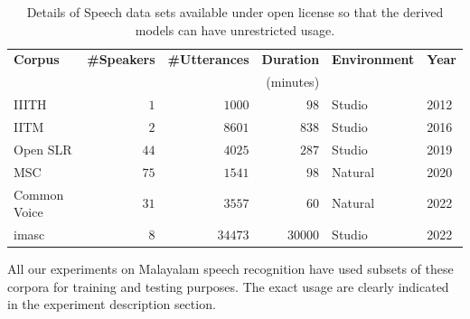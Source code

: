 \begin{table}[htpb]
	\caption{Details of Speech data sets available under open license so that the derived models can have unrestricted usage.}
	\label{tab:fullspeechdatasets}
	\centering
	\begin{tabular}{lrrrll}
		\hline \hline
		\textbf{Corpus}                   & \textbf{\#Speakers} & \textbf{\#Utterances} & \textbf{Duration} & \textbf{Environment} & \textbf{Year} \\
  		                  &&  & (minutes) &  & \\ \hline
		IIITH \cite{prahallad2012iiit}    & $1$                   & $1000$                  & $98$                & Studio        & 2012          \\
		IITM \cite{baby2016resources}     & $2$                   & $8601$                  & $838$               & Studio        & 2016          \\
		Open SLR \cite{he-etal-2020-open} & $44$                  & $4025$                  & $287$               & Studio        & 2019          \\

		MSC \cite{smcspeech}              & $75$                  & $1541$                  & $98$                & Natural       & 2020          \\ Common Voice & $31$      & $3557$                          &
		$60$                                & Natural             & 2022                                                                      \\

		\gls{imasc} \cite{gopinath2022imasc}                     & $8$                  &       $34473$          & $30000$                & Studio       & 2022          \\

		\hline

	\end{tabular}

\end{table}

All our experiments on  Malayalam speech recognition have used subsets of these corpora for training and testing purposes. The exact usage are clearly indicated in the experiment description section.



